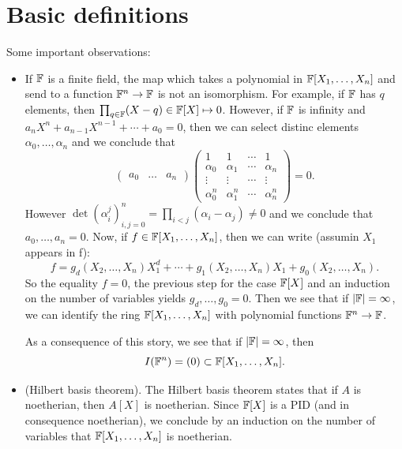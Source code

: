 \section{Basic definitions}
Some important observations:
\begin{itemize}
    \item If $\mathbb{F}$ is a finite field, the map which takes a polynomial in $\mathbb{F}[X_1,\dots,X_n]$ and 
    send to a function $\mathbb{F}^n\to \mathbb{F}$ is not an isomorphism. For example, if $\mathbb{F}$ 
    has $q$ elements, then $\prod_{q\in\mathbb{F}}(X-q)\in\mathbb{F}[X]\mapsto 0$. However, if $\mathbb{F}$ is infinity and 
    $a_nX^n + a_{n-1}X^{n-1}+\cdots + a_0 = 0$, then we can select distinc elements $\alpha_0,\dots,\alpha_{n}$ and 
    we conclude that 
    \begin{equation}
        \begin{pmatrix}a_0&\dots&a_n\end{pmatrix}
       \begin{pmatrix}
            1&1&\cdots&1\\\alpha_0&\alpha_1&\cdots&\alpha_{n}\\\vdots&\vdots&\cdots&\vdots\\
            \alpha_0^n&\alpha_1^n&\cdots&\alpha_{n}^{n}
        \end{pmatrix}=0.
    \end{equation}
    However $\det(\alpha_i^j)_{i,j=0}^n=\prod_{i<j}(\alpha_i-\alpha_j)\neq0$ and we conclude that $a_0,\dots,a_n=0$. 
    Now, if $f\in \mathbb{F}[X_1,\dots,X_n]$, then we can write (assumin $X_1$ appears in f):
    \begin{equation}
        f = g_d(X_2,\dots,X_n)X_1^d +\cdots + g_1(X_2,\dots,X_n)X_1 + g_0(X_2,\dots,X_n).
    \end{equation}
    So the equality $f=0$, the previous step for the case $\mathbb{F}[X]$ and an induction on the number of variables yields
    $g_d,\dots,g_0 =0$. Then we see that if $|\mathbb{F}|=\infty$, we can identify the ring $\mathbb{F}[X_1,\dots,X_n]$ with 
    polynomial functions $\mathbb{F}^n\to\mathbb{F}$.\par 

    As a consequence of this story, we see that if $|\mathbb{F}|=\infty$, then 
    \begin{equation}
        I(\mathbb{F}^n)=(0)\subset\mathbb{F}[X_1,\dots,X_n].
    \end{equation}

    \item(Hilbert basis theorem). The Hilbert basis theorem states that if $A$ is noetherian, then $A[X]$ is noetherian. 
    Since $\mathbb{F}[X]$ is a PID (and in consequence noetherian), we conclude by an induction on the number of variables that 
    $\mathbb{F}[X_1,\dots, X_n]$ is noetherian. 


\end{itemize}
